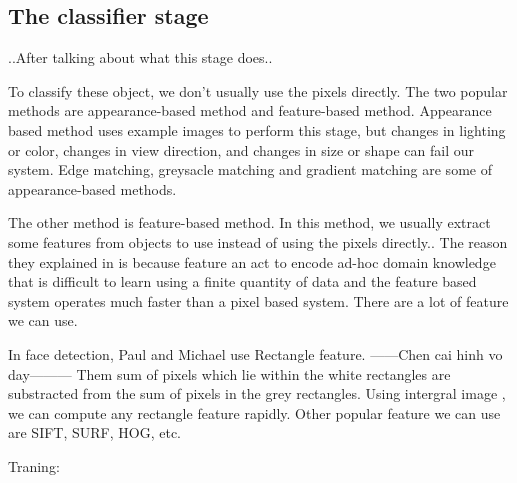 \subsection{The classifier stage}

..After talking about what this stage does..

To classify these object, we don't usually use the pixels directly. The two popular methods are appearance-based method and feature-based method. 
Appearance based method uses example images to perform this stage, but changes in lighting or color, changes in view direction, and changes in size or shape can fail our system. Edge matching, greysacle matching and gradient matching are some of appearance-based methods.

The other method is feature-based method. In this method, we usually extract some features from objects to use instead of using the pixels directly.\cite{realtimeface}. The reason they explained in \cite{realtimeface} is because feature an act to encode ad-hoc domain knowledge that is difficult to learn using a finite quantity of data and the feature based system operates much faster than a pixel based system. There are a lot of feature we can use. 

In face detection\cite{realtimeface}, Paul and Michael use Rectangle feature. 
------Chen cai hinh vo day---------
Them sum of pixels which lie within the white rectangles are substracted from the sum of pixels in the grey rectangles. Using intergral image \cite{realtimeface}, we can compute any rectangle feature rapidly. Other popular feature we can use are SIFT, SURF, HOG, etc.

Traning: